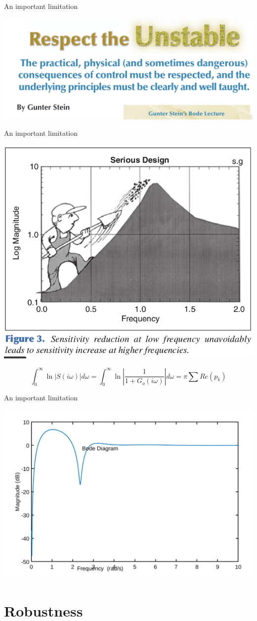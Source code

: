 \documentclass[presentation,aspectratio=169]{beamer}
\begin{document}
\begin{frame}[label={sec:orgee41180}]{An important limitation}
\begin{center}
\includegraphics[width=0.5\linewidth]{../../figures/Stein-title.png}
\end{center}
\end{frame}


\begin{frame}[label={sec:orgc23a577}]{An important limitation}
\begin{center}
\includegraphics[width=0.5\linewidth]{../../figures/stein-serious-design.png}
\end{center}

\[ \int _{0}^{\infty }\ln |S(i\omega )|d\omega =\int _{0}^{\infty }\ln \left|{\frac {1}{1+G_o(i\omega )}}\right|d\omega =\pi \sum Re(p_{k}) \]
\end{frame}

\begin{frame}[label={sec:org16d9c7b}]{An important limitation}
\begin{center}
\includegraphics[width=0.6\linewidth]{../../figures/sensitivity-linear.png}
\end{center}
\end{frame}
\section{Robustness}
\label{sec:orga013b17}
\end{document}
